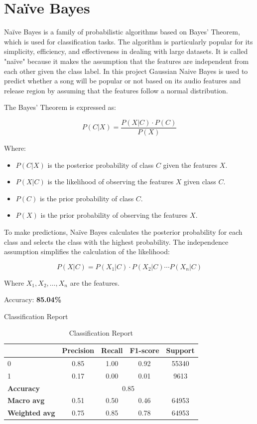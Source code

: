 \section{Naïve Bayes}
Naïve Bayes is a family of probabilistic algorithms based on Bayes' Theorem, which is used for classification tasks.
The algorithm is particularly popular for its simplicity, efficiency, and effectiveness in dealing with large datasets.
It is called "naïve" because it makes the assumption that the features are independent from each other given the class label.
In this project Gaussian Naive Bayes is used to predict whether a song will be popular or not based on its audio features and release region by assuming that
the features follow a normal distribution. 

The Bayes' Theorem is expressed as:

\[
P(C | X) = \frac{P(X | C) \cdot P(C)}{P(X)}
\]

Where:
\begin{itemize}
    \item \( P(C | X) \) is the posterior probability of class \( C \) given the features \( X \).
    \item \( P(X | C) \) is the likelihood of observing the features \( X \) given class \( C \).
    \item \( P(C) \) is the prior probability of class \( C \).
    \item \( P(X) \) is the prior probability of observing the features \( X \).
\end{itemize}

To make predictions, Naïve Bayes calculates the posterior probability for each class and selects the class with the highest probability. The independence assumption simplifies the calculation of the likelihood:

\[
P(X | C) = P(X_1 | C) \cdot P(X_2 | C) \cdots P(X_n | C)
\]

Where \( X_1, X_2, \ldots, X_n \) are the features.

Accuracy: \textbf{85.04\%}


Classification Report
\begin{table}[h]
    \centering
    \begin{tabular}{lcccc}
        \toprule
        & \textbf{Precision} & \textbf{Recall} & \textbf{F1-score} & \textbf{Support} \\
        \midrule
        0 & 0.85 & 1.00 & 0.92 & 55340 \\
        1 & 0.17 & 0.00 & 0.01 & 9613 \\
        \midrule
        \textbf{Accuracy} & \multicolumn{4}{c}{0.85} \\
        \textbf{Macro avg} & 0.51 & 0.50 & 0.46 & 64953 \\
        \textbf{Weighted avg} & 0.75 & 0.85 & 0.78 & 64953 \\
        \bottomrule
    \end{tabular}
    \caption{Classification Report}
    \label{tab:classification_report}
\end{table}

